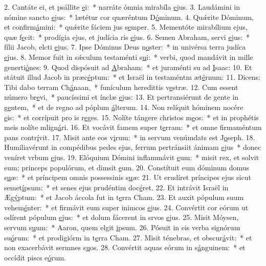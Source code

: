 2. Cantáte ei, et psállite \uline{e}i:~* narráte ómnia mirabíla \uline{e}jus.
3. Laudámini in nómine sancto \uline{e}jus:~* lætétur cor quæréntum D\uline{ó}minum.
4. Quǽrite Dóminum, et confirm\uline{á}mini:~* quǽrite fáciem jus s\uline{e}mper.
5. Mementóte mirabílium ejus, quæ f\uline{e}cit:~* prodígia ejus, et judícia ris \uline{e}jus.
6. Semen Abraham, servi \uline{e}jus:~* fílii Jacob, elcti \uline{e}jus.
7. Ipse Dóminus Deus n\uline{o}ster:~* in univérsa terra judíca \uline{e}jus.
8. Memor fuit in sǽculum testaménti s\uline{u}i:~* verbi, quod mandávit in mille generti\uline{ó}nes:
9. Quod dispósuit ad \uline{A}braham:~* et juraménti su ad \uline{I}saac:
10. Et státuit illud Jacob in præc\uline{é}ptum:~* et Israël in testaméntm æt\uline{é}rnum:
11. Dicens: Tibi dabo terram Ch\uline{á}naan,~* funículum heredittis v\uline{e}stræ.
12. Cum essent número br\uline{e}vi,~* paucíssimi et ínclæ \uline{e}jus:
13. Et pertransiérunt de gente in g\uline{e}ntem,~* et de regno ad póplum \uline{á}lterum.
14. Non relíquit hóminem nocére \uline{e}is:~* et corrípuit pro is r\uline{e}ges.
15. Nolíte tángere christos m\uline{e}os:~* et in prophétis meis nolíte mlign\uline{á}ri.
16. Et vocávit famem super t\uline{e}rram:~* et omne firmaméntum pans contr\uline{í}vit.
17. Misit ante eos v\uline{i}rum:~* in servum venúmdats est J\uline{o}seph.
18. Humiliavérunt in compédibus pedes ejus, ferrum pertránsiit ánimam \uline{e}jus~* donec veníret vrbum \uline{e}jus.
19. Elóquium Dómini inflammávit \uline{e}um:~* misit rex, et solvit eum; princeps populórum, et dimsit \uline{e}um.
20. Constítuit eum dóminum domus s\uline{u}æ:~* et príncipem omnis possessinis s\uline{u}æ:
21. Ut erudíret príncipes ejus sicut semet\uline{í}psum:~* et senes ejus prudéntim doc\uline{é}ret.
22. Et intrávit Israël in Æg\uline{ý}ptum:~* et Jacob áccola fut in t\uline{e}rra Cham.
23. Et auxit pópulum suum vehem\uline{é}nter:~* et firmávit eum super inimcos \uline{e}jus.
24. Convértit cor eórum ut odírent pópulum \uline{e}jus:~* et dolum fácerent in srvos \uline{e}jus.
25. Misit Móysen, servum s\uline{u}um:~* Aaron, quem elgit \uline{i}psum.
26. Pósuit in eis verba signórum su\uline{ó}rum:~* et prodigiórm in t\uline{e}rra Cham.
27. Misit ténebras, et obscur\uline{á}vit:~* et non exacerbávit sermnes s\uline{u}os.
28. Convértit aquas eórum in s\uline{á}nguinem:~* et occídit piscs e\uline{ó}rum.
